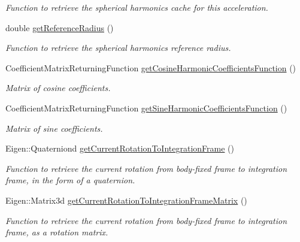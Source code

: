 \begin{DoxyCompactItemize}
\begin{DoxyCompactList}\small\item\em Function to retrieve the spherical harmonics cache for this acceleration. \end{DoxyCompactList}\item 
double \hyperlink{classtudat_1_1gravitation_1_1SphericalHarmonicsGravitationalAccelerationModel_a48289f0a802dac258e731e2d758c0cc9}{get\+Reference\+Radius} ()
\begin{DoxyCompactList}\small\item\em Function to retrieve the spherical harmonics reference radius. \end{DoxyCompactList}\item 
Coefficient\+Matrix\+Returning\+Function \hyperlink{classtudat_1_1gravitation_1_1SphericalHarmonicsGravitationalAccelerationModel_a3e320a0a322b9b180eba268427933a90}{get\+Cosine\+Harmonic\+Coefficients\+Function} ()
\begin{DoxyCompactList}\small\item\em Matrix of cosine coefficients. \end{DoxyCompactList}\item 
Coefficient\+Matrix\+Returning\+Function \hyperlink{classtudat_1_1gravitation_1_1SphericalHarmonicsGravitationalAccelerationModel_aa8c3b79d97dba27c633acb07c9f7b8e0}{get\+Sine\+Harmonic\+Coefficients\+Function} ()
\begin{DoxyCompactList}\small\item\em Matrix of sine coefficients. \end{DoxyCompactList}\item 
Eigen\+::\+Quaterniond \hyperlink{classtudat_1_1gravitation_1_1SphericalHarmonicsGravitationalAccelerationModel_a1fdbcde7f7ca93d3a9051a4086e7e5d7}{get\+Current\+Rotation\+To\+Integration\+Frame} ()
\begin{DoxyCompactList}\small\item\em Function to retrieve the current rotation from body-\/fixed frame to integration frame, in the form of a quaternion. \end{DoxyCompactList}\item 
Eigen\+::\+Matrix3d \hyperlink{classtudat_1_1gravitation_1_1SphericalHarmonicsGravitationalAccelerationModel_ad8a859958eff18272ebcbb9e467f1cc6}{get\+Current\+Rotation\+To\+Integration\+Frame\+Matrix} ()
\begin{DoxyCompactList}\small\item\em Function to retrieve the current rotation from body-\/fixed frame to integration frame, as a rotation matrix. \end{DoxyCompactList}\end{DoxyCompactItemize}

